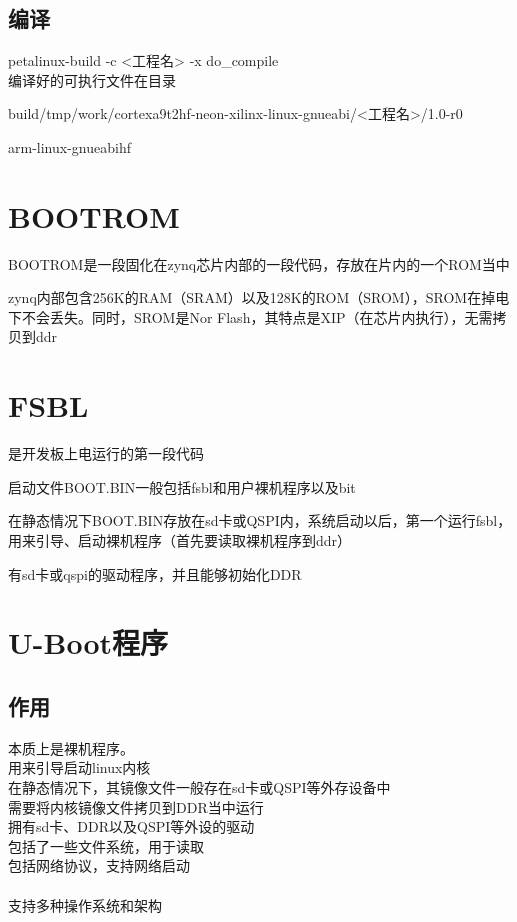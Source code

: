\documentclass[12pt, a4paper, oneside]{ctexbook}
\newcommand{\hl}[1]{\hlbox{#1}}
\newcounter{#2}
\newcounter{#2}[#1]
\numberwithin{#2}{#1}
\begin{document}
              \section{编译}
              petalinux-build -c <工程名> -x do\_compile\\
               
              编译好的可执行文件在目录

              build/tmp/work/cortexa9t2hf-neon-xilinx-linux-gnueabi/<工程名>/1.0-r0

              \hl{交叉编译工具}
              arm-linux-gnueabihf

              \chapter{BOOTROM}
              
              BOOTROM是一段固化在zynq芯片内部的一段代码，存放在片内的一个ROM当中

              zynq内部包含256K的RAM（SRAM）以及128K的ROM（SROM），SROM在掉电下不会丢失。同时，SROM是Nor Flash，其特点是XIP（在芯片内执行），无需拷贝到ddr

              \chapter{FSBL}
              是开发板上电运行的第一段代码

              启动文件BOOT.BIN一般包括fsbl和用户裸机程序以及bit

              在静态情况下BOOT.BIN存放在sd卡或QSPI内，系统启动以后，第一个运行fsbl，用来引导、启动裸机程序（首先要读取裸机程序到ddr）

              有sd卡或qspi的驱动程序，并且能够初始化DDR

              \chapter{U-Boot程序}
              \section{作用}
              本质上是裸机程序。\\
              用来引导启动linux内核\\
              在静态情况下，其镜像文件一般存在sd卡或QSPI等外存设备中
              \\需要将内核镜像文件拷贝到DDR当中运行\\
              拥有sd卡、DDR以及QSPI等外设的驱动\\
              包括了一些文件系统，用于读取\\
              包括网络协议，支持网络启动\\\\
              支持多种操作系统和架构
\end{document}
